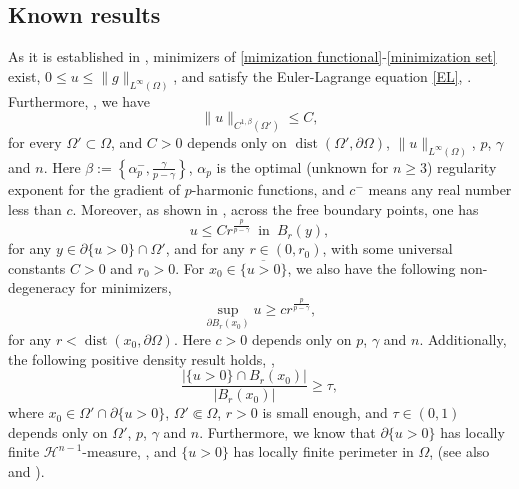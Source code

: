 \documentclass[11pt, reqno]{amsart}
\numberwithin{equation}{section}
\numberwithin{theorem}{section}
\numberwithin{lemma}{section}
\numberwithin{corollary}{section}
\numberwithin{remark}{section}
\numberwithin{proposition}{section}
\numberwithin{definition}{section}
\newcommand{\dist}{\operatorname{dist}}
\def \H {\mathcal{H}^{n-1}}
\begin{document}
\subsection{Known results}
As it is established in \cite[Theorem 2.1]{ATV23}, minimizers of \eqref{mimization functional}-\eqref{minimization set} exist, $0\le u\le\|g\|_{L^\infty(\Omega)}$, and satisfy the Euler-Lagrange equation \eqref{EL}, \cite[Proposition 2.1]{ATU25}. Furthermore, \cite[Theorem 3.1]{ATV23}, we have
\begin{equation}\label{local regularity}
    \|u\|_{C^{1,\beta}(\Omega')}\le C,
\end{equation}
for every $\Omega'\subset\Omega$, and $C>0$ depends only on $\dist(\Omega',\partial\Omega)$, $\|u\|_{L^\infty(\Omega)}$, $p$, $\gamma$ and $n$. Here $\beta:=\left\{\alpha_p^-,\frac{\gamma}{p-\gamma}\right\}$, $\alpha_p$ is the optimal (unknown for $n\ge3$) regularity exponent for the gradient of $p$-harmonic functions, and $c^-$ means any real number less than $c$. Moreover, as shown in \cite[Theorem 4.1 and Theorem 6.1]{ATV23}, across the free boundary points, one has
\begin{equation}\label{growth}
    u\le Cr^{\frac{p}{p-\gamma}}\,\,\,\text{in}\,\,\,B_r(y),
\end{equation}
for any $y\in\partial\{u>0\}\cap\Omega'$, and for any $r\in(0,r_0)$, with some universal constants $C>0$ and $r_0>0$. For $x_0\in\overline{\{u>0\}}$, we also have the following non-degeneracy for minimizers, \cite[Proposition 4.1]{ATU25}
\begin{equation}\label{nondegeneracy}
    \sup_{\partial B_r(x_0)}u\ge cr^{\frac{p}{p-\gamma}},
\end{equation}
for any $r<\dist(x_0,\partial \Omega)$. Here $c>0$ depends only on $p$, $\gamma$ and $n$. Additionally, the following positive density result holds, \cite[Corollary 4.2]{ATU25},
\begin{equation}\label{positive density}
    \frac{|\{u>0\}\cap B_r(x_0)|}{|B_r(x_0)|}\ge\tau,
\end{equation}
where $x_0\in\Omega'\cap\partial\{u>0\}$, $\Omega'\Subset\Omega$, $r>0$ is small enough, and $\tau \in(0,1)$ depends only on $\Omega'$, $p$, $\gamma$ and $n$. Furthermore, we know that $\partial\{u>0\}$ has locally finite $\H$-measure, \cite[Theorem 6.1]{ATU25}, and $\{u>0\}$ has locally finite perimeter in $\Omega$, \cite[Remark 6.1]{ATU25} (see also \cite[Theorem 4.5.11]{F69} and \cite{M12,Ph83}). 
\end{document}

